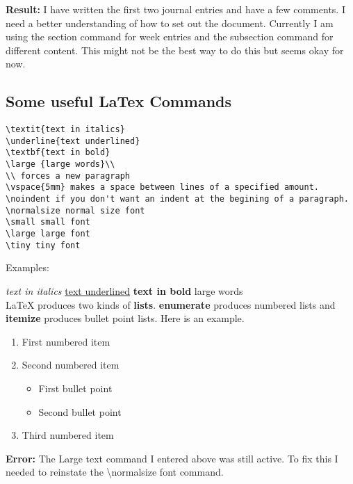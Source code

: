 \documentclass[a4paper,12pt]{article}
\begin{document}
\noindent \textbf{Result:} I have written the first two journal entries and have a few comments. I need a better understanding of how to set out the document. Currently I am using the section command for week entries and the subsection command for different content. This might not be the best way to do this but seems okay for now.\\

\subsection{Some useful LaTex Commands} 

\begin{verbatim}
\textit{text in italics} 
\underline{text underlined}
\textbf{text in bold}
\large {large words}\\
\\ forces a new paragraph
\vspace{5mm} makes a space between lines of a specified amount.
\noindent if you don't want an indent at the begining of a paragraph.
\normalsize normal size font
\small small font
\large large font
\tiny tiny font

\end{verbatim}

Examples:

\textit{text in italics} 
\underline{text underlined}
\textbf{text in bold}
\large {large words}\\

\vspace{5mm}
LaTeX produces two kinds of {\textbf{lists}}. \textbf{enumerate} produces numbered lists and \textbf{itemize} produces bullet point lists. Here is an example.
\begin{enumerate}
\item First numbered item
\item Second numbered item
\begin{itemize}
\item First bullet point
\item Second bullet point
\end{itemize}
\item Third numbered item
\end{enumerate}

\noindent \textbf{Error:} The Large text command I entered above was still active. To fix this I needed to reinstate the \textbackslash normalsize font command.

\vspace{5mm}
\end{document}
